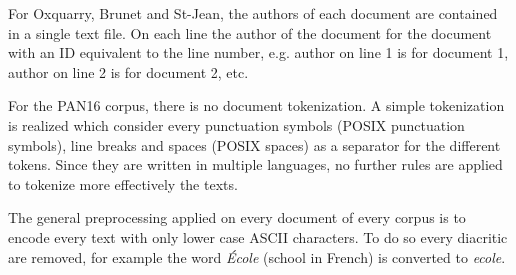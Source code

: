 For Oxquarry, Brunet and St-Jean, the authors of each document are contained in a single text file.
On each line the author of the document for the document with an ID equivalent to the line number, e.g. author on line 1 is for document 1, author on line 2 is for document 2, etc.

For the PAN16 corpus, there is no document tokenization.
A simple tokenization is realized which consider every punctuation symbols (POSIX punctuation symbols), line breaks and spaces (POSIX spaces) as a separator for the different tokens.
Since they are written in multiple languages, no further rules are applied to tokenize more effectively the texts.

The general preprocessing applied on every document of every corpus is to encode every text with only lower case ASCII characters.
To do so every diacritic are removed, for example the word \textit{École} (school in French) is converted to \textit{ecole}.
